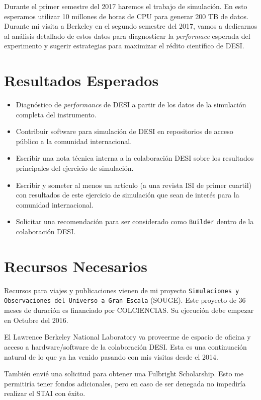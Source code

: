 \documentclass[12pt,spanish]{article}
\begin{document}
Durante el primer semestre del 2017 haremos el trabajo de
simulaci\'on. En esto esperamos utilizar 10 millones de horas de CPU
para generar 200 TB de datos.
Durante mi visita a Berkeley en el segundo semestre del 2017, vamos
a dedicarnos al an\'alisis detallado de estos datos para diagnosticar
la \emph{performace} esperada del experimento y sugerir estrategias para
maximizar el r\'edito cient\'ifico de DESI.  


\section*{Resultados Esperados}
\begin{itemize}
\item Diagn\'ostico de \textit{performance} de DESI a partir de los
  datos de la simulaci\'on completa del instrumento.
\item Contribuir software para simulaci\'on de DESI en repositorios de
  acceso p\'ublico a la comunidad internacional.
\item Escribir una nota t\'ecnica interna a la colaboraci\'on DESI
  sobre los resultados principales del ejercicio de simulaci\'on.
\item Escribir y someter al menos un art\'iculo (a una revista ISI
  de primer cuartil) con resultados de este ejercicio de
  simulaci\'on que sean de inter\'es para la comunidad internacional.  
\item Solicitar una recomendaci\'on para ser   considerado como
  \texttt{Builder}  dentro de la colaboraci\'on DESI.  
 \end{itemize}

\section*{Recursos Necesarios}

Recursos para viajes y publicaciones vienen de mi proyecto
\texttt{Simulaciones y Observaciones del Universo a Gran Escala} (SOUGE). Este
proyecto de 36 meses de duraci\'on es financiado por COLCIENCIAS. Su
ejecuci\'on debe empezar en Octubre del 2016. 

El Lawrence Berkeley National Laboratory va proveerme de espacio de
oficina y acceso a hardware/software de la colaboraci\'on DESI. Esta
es una continuaci\'on natural de lo que ya ha venido pasando con mis
visitas desde el 2014. 

Tambi\'en envi\'e una solicitud para obtener una Fulbright
Scholarship. Esto me permitir\'ia tener fondos adicionales, pero en
caso de ser denegada no impedir\'ia realizar el STAI con \'exito.
\end{document}
